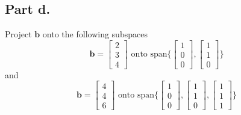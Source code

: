 \subsection{Part d.}
Project $\mathbf{b}$ onto the following subspaces
\begin{equation}
    \mathbf{b} =
    \begin{bmatrix}
        2       \\
        3       \\
        4  
    \end{bmatrix}
    \text{ onto span}
    \Bigg\{
        \begin{bmatrix}
            1       \\
            0       \\
            0
        \end{bmatrix}
        ,
        \begin{bmatrix}
            1       \\
            1       \\
            0
        \end{bmatrix}
        \Bigg\}
\end{equation}
and 
\begin{equation}
    \mathbf{b} =
    \begin{bmatrix}
        4       \\
        4       \\
        6  
    \end{bmatrix}
    \text{ onto span}
    \Bigg\{
        \begin{bmatrix}
            1       \\
            0       \\
            0
        \end{bmatrix}
        ,
        \begin{bmatrix}
            1       \\
            1       \\
            0
        \end{bmatrix},
        \begin{bmatrix}
            1       \\
            1       \\
            1
        \end{bmatrix}
        \Bigg\}
\end{equation}
